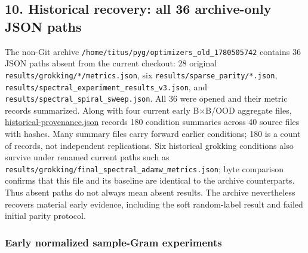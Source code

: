 \documentclass[
  british,
  10pt,
  a4paper,
]{article}
\begin{document}
\subsection{\texorpdfstring{10. Historical recovery: all 36
archive-\allowbreak{}only JSON
paths}{10. Historical recovery: all 36  JSON paths}}\label{classical-evidence--historical-recovery-all-36-archive-only-json-paths}

The non-Git archive
\texttt{/\allowbreak{}home/\allowbreak{}titus/\allowbreak{}pyg/\allowbreak{}optimizers\_\allowbreak{}old\_\allowbreak{}1780505742}
contains 36 JSON paths absent from the current checkout: 28 original
\texttt{results/\allowbreak{}grokking/\allowbreak{}*/\allowbreak{}metrics.\allowbreak{}json},
six
\texttt{results/\allowbreak{}sparse\_\allowbreak{}parity/\allowbreak{}*.\allowbreak{}json},
\texttt{results/\allowbreak{}spectral\_\allowbreak{}experiment\_\allowbreak{}results\_\allowbreak{}v3.\allowbreak{}json},
and
\texttt{results/\allowbreak{}spectral\_\allowbreak{}spiral\_\allowbreak{}sweep.\allowbreak{}json}.
All 36 were opened and their metric records summarized.\allowbreak{}
Along with four current early B×B/OOD aggregate files,
\href{../analysis/historical-provenance.json}{historical-\allowbreak{}provenance.\allowbreak{}json}
records 180 condition summaries across 40 source files with hashes. Many
summary files carry forward earlier conditions; 180 is a count of
records, not independent replications\allowbreak{}.\allowbreak{} Six
historical grokking conditions also survive under renamed current paths
such as
\texttt{results/\allowbreak{}grokking/\allowbreak{}final\_\allowbreak{}spectral\_\allowbreak{}adamw\_\allowbreak{}metrics.\allowbreak{}json};
byte comparison confirms that this file and its baseline are identical
to the archive counterparts\allowbreak{}.\allowbreak{} Thus absent paths
do not always mean absent results. The archive nevertheless recovers
material early evidence, including the soft random-\allowbreak{}label
result and failed initial parity protocol.

\subsubsection{\texorpdfstring{Early normalized sample-\allowbreak{}Gram
experiments}{Early normalized  experiments}}\label{classical-evidence--early-normalized-sample-gram-experiments}
\end{document}
